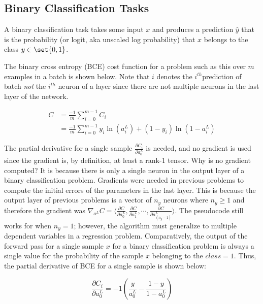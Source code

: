 \documentclass{article}
\DeclarePairedDelimiter\set\{\}
\begin{document}
\subsection{Binary Classification Tasks}

A binary classification task takes some input $x$ and produces a prediction
$\hat{y}$ that is the probability (or logit, aka unscaled log probability) that
$x$ belongs to the class $y \in \set{0, 1}$.

The binary cross entropy (BCE) cost function for a problem such as this over
$m$ examples in a batch is shown below. Note that $i$ denotes
the $i^{th} $prediction of batch \textit{not} the $i^{th}$ neuron of a layer
since there are not multiple neurons in the last layer of the network.

\begin{equation}
	\begin{aligned}
		C & = \frac{-1}{m} \sum_{i = 0}^{m-1} {C_{i}}                                                     \\
		  & = \frac{-1}{m} \sum_{i = 0}^{m-1}{ y_{i} \ln{(a_{i}^{L})} + (1 - y_{i}) \ln{(1 - a_{i}^{L})}}
	\end{aligned}
\end{equation}

The partial derivative for a single sample $\frac{\partial C_i}{\partial a_{0}^{L}}$
is needed, and no gradient is used
since the gradient is, by definition, at least a rank-1 tensor. Why is no
gradient computed? It is because there is only a single neuron in the output
layer of a binary classification problem. Gradients were needed in previous
problems to compute the initial errors of the parameters in the last layer.
This is because the output layer of previous problems is a vector of $n_y$ neurons
where $n_y \geq 1$ and therefore the gradient was
${\nabla_{a^{L}} C = \langle \frac{\partial C}{\partial a_0^{L}}, \frac{\partial C}{\partial a_1^{L}}, \cdots, \frac{\partial C}{\partial a_{(n_{y} - 1)}^{L}} \rangle}$.
The pseudocode still works for when $n_y = 1$; however, the algorithm must
generalize to multiple dependent variables in a regression problem. Comparatively,
the output of the forward pass for a single sample $x$ for a binary classification
problem is always a single value for the probability of the sample $x$ belonging
to the $class = 1$.
Thus, the partial derivative of BCE for a single sample is shown below:

\begin{equation}
	\frac{\partial C_i}{\partial a_{0}^{L}} = -1(\frac{y}{a_{0}^{L}} - \frac{ 1 - y}{ 1 - a_{0}^{L} })
\end{equation}
\end{document}
